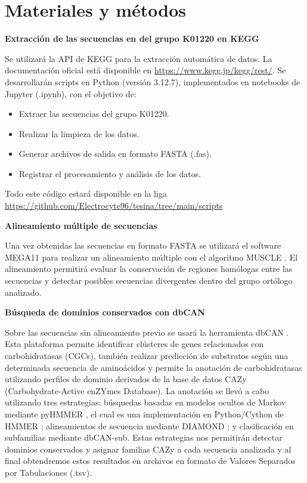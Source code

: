 \section{Materiales y métodos}

\hspace{1cm}\textbf{Extracción de las secuencias en del grupo K01220 en KEGG}

Se utilizará la API de KEGG \parencite{Kanehisa_2004, Kanehisa_2022} para la extracción automática de datos. La documentación oficial está disponible en \url{https://www.kegg.jp/kegg/rest/}. Se desarrollarán scripts en Python (versión 3.12.7), implementados en notebooks de Jupyter (.ipynb), con el objetivo de:
\begin{itemize}
	\item Extraer las secuencias del grupo K01220.
	\item Realizar la limpieza de los datos.
	\item Generar archivos de salida en formato FASTA (.fas).
	\item Registrar el procesamiento y análisis de los datos.
\end{itemize}
Todo este código estará disponible en la liga \url{https://github.com/Electrocyte96/tesina/tree/main/scripts}

\hspace{1cm}\textbf{Alineamiento múltiple de secuencias}

Una vez obtenidas las secuencias en formato FASTA se utilizará el software MEGA11 \parencite{Tamura_2021} para realizar un alineamiento múltiple con el algoritmo MUSCLE \parencite{Edgar_2004}. El alineamiento permitirá evaluar la conservación de regiones homólogas entre las secuencias y detectar posibles secuencias divergentes dentro del grupo ortólogo analizado. 

\hspace{1cm}\textbf{Búsqueda de dominios conservados con dbCAN}

Sobre las secuencias sin alineamiento previo se usará la herramienta dbCAN \parencite{Zheng_2023, Zhang_2018, Huang_2017}. Esta plataforma permite identificar clústeres de genes relacionados con carbohidratasas (CGCs), también realizar predicción de substratos según una determinada secuencia de aminoácidos y  permite la anotación de carbohidratasas utilizando perfiles de dominio derivados de la base de datos CAZy (Carbohydrate-Active enZYmes Database). La anotación se llevó a cabo utilizando tres estrategias: búsquedas basadas en modelos ocultos de Markov mediante pyHMMER \parencite{Larralde_2023}, el cual es una implementación en Python/Cython de HMMER \parencite{Eddy_2011}; alineamientos de secuencia mediante DIAMOND \parencite{Buchfink_2021}; y clasificación en subfamilias mediante dbCAN-sub. Estas estrategias nos permitirán detectar dominios conservados y asignar familias CAZy a cada secuencia analizada y al final obtendremos estos resultados en archivos en formato de Valores Separados por Tabulaciones (.tsv).

